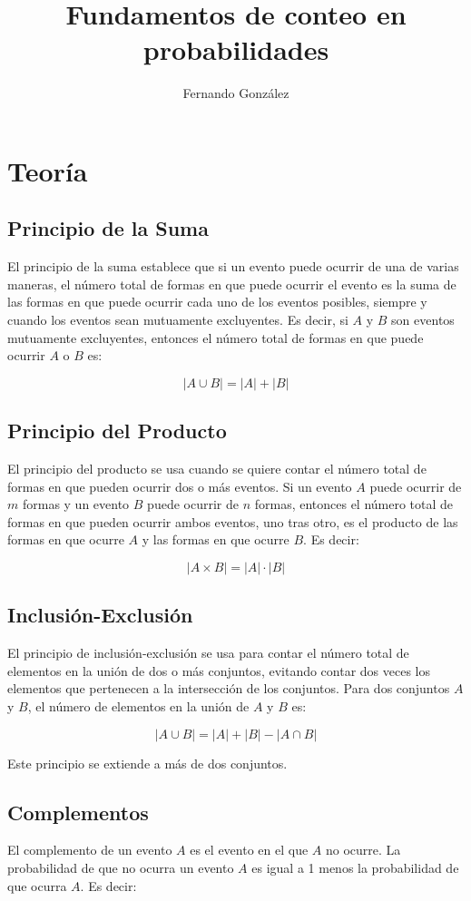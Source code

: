 \documentclass[letterpaper,12pt]{article}
\title{Fundamentos de conteo en probabilidades}
\author{Fernando González}
\date{}
\begin{document}
	
	\maketitle
	
	\section{Teoría}
	
	\subsection{Principio de la Suma}
	El principio de la suma establece que si un evento puede ocurrir de una de varias maneras, el número total de formas en que puede ocurrir el evento es la suma de las formas en que puede ocurrir cada uno de los eventos posibles, siempre y cuando los eventos sean mutuamente excluyentes. Es decir, si $A$ y $B$ son eventos mutuamente excluyentes, entonces el número total de formas en que puede ocurrir $A$ o $B$ es:
	
	\[
	|A \cup B| = |A| + |B|
	\]
	
	\subsection{Principio del Producto}
	El principio del producto se usa cuando se quiere contar el número total de formas en que pueden ocurrir dos o más eventos. Si un evento $A$ puede ocurrir de $m$ formas y un evento $B$ puede ocurrir de $n$ formas, entonces el número total de formas en que pueden ocurrir ambos eventos, uno tras otro, es el producto de las formas en que ocurre $A$ y las formas en que ocurre $B$. Es decir:
	
	\[
	|A \times B| = |A| \cdot |B|
	\]
	
	\subsection{Inclusión-Exclusión}
	El principio de inclusión-exclusión se usa para contar el número total de elementos en la unión de dos o más conjuntos, evitando contar dos veces los elementos que pertenecen a la intersección de los conjuntos. Para dos conjuntos $A$ y $B$, el número de elementos en la unión de $A$ y $B$ es:
	
	\[
	|A \cup B| = |A| + |B| - |A \cap B|
	\]
	
	Este principio se extiende a más de dos conjuntos.
	
	\subsection{Complementos}
	El complemento de un evento $A$ es el evento en el que $A$ no ocurre. La probabilidad de que no ocurra un evento $A$ es igual a 1 menos la probabilidad de que ocurra $A$. Es decir:
	
\end{document}
